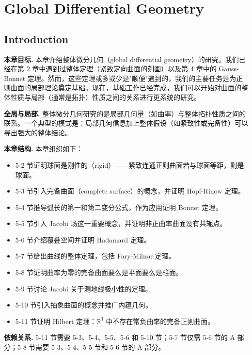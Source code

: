 \chapter{Global Differential Geometry}\label{chap:global-differential-geometry}

\section{Introduction}\label{sec:intro-ch5}

\textbf{本章目标.} 本章介绍整体微分几何（global differential geometry）的研究。我们已经在第 2 章中遇到过整体定理（紧致定向曲面的刻画）以及第 4 章中的 Gauss-Bonnet 定理。然而，这些定理或多或少是"顺便"遇到的，我们的主要任务是为正则曲面的局部理论奠定基础。现在，基础工作已经完成，我们可以开始对曲面的整体性质与局部（通常是拓扑）性质之间的关系进行更系统的研究。

\textbf{全局与局部.} 整体微分几何研究的是局部几何量（如曲率）与整体拓扑性质之间的联系。一个典型的模式是：局部几何信息加上整体假设（如紧致性或完备性）可以导出强大的整体结论。

\textbf{本章结构.} 本章组织如下：
\begin{itemize}
  \item 5-2 节证明球面是刚性的（rigid）——紧致连通正则曲面若与球面等距，则是球面。
  \item 5-3 节引入完备曲面（complete surface）的概念，并证明 Hopf-Rinow 定理。
  \item 5-4 节推导弧长的第一和第二变分公式，作为应用证明 Bonnet 定理。
  \item 5-5 节引入 Jacobi 场这一重要概念，并证明非正曲率曲面没有共轭点。
  \item 5-6 节介绍覆叠空间并证明 Hadamard 定理。
  \item 5-7 节给出曲线的整体定理，包括 Fary-Milnor 定理。
  \item 5-8 节证明曲率为零的完备曲面要么是平面要么是柱面。
  \item 5-9 节讨论 Jacobi 关于测地线极小性的定理。
  \item 5-10 节引入抽象曲面的概念并推广内蕴几何。
  \item 5-11 节证明 Hilbert 定理：$\mathbb{R}^3$ 中不存在常负曲率的完备正则曲面。
\end{itemize}

\textbf{依赖关系.} 5-11 节需要 5-3、5-4、5-5、5-6 和 5-10 节；5-7 节仅需 5-6 节的 A 部分；5-8 节需要 5-3、5-4、5-5 节和 5-6 节的 A 部分。

